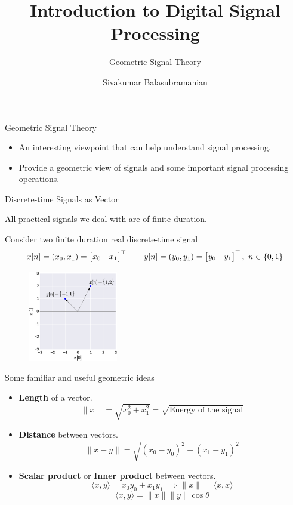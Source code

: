 \documentclass[aspectratio=169]{beamer}
\title{Introduction to Digital Signal Processing}
\subtitle{Geometric Signal Theory}
\author{Sivakumar Balasubramanian}
\institute[Christian Medical College] %
{
  \inst{}%
  Department of Bioengineering\\
  Christian Medical College, Bagayam\\
  Vellore 632002
}
\date{}
\let\olditem\item
\renewcommand{\item}{\setlength{\itemsep}{\fill}\olditem}
\def\lp{\ensuremath\left(}
\def\rp{\ensuremath\right)}
\def\bmx{\ensuremath\begin{bmatrix*}[r]}
\def\emx{\ensuremath\end{bmatrix*}}
\begin{document}
\begin{frame}
  \titlepage
\end{frame}

\begin{frame}{Geometric Signal Theory}
\begin{itemize}
  \item An interesting viewpoint that can help understand signal processing.
  \item Provide a geometric view of signals and some important signal processing operations.
\end{itemize}
\end{frame}

\begin{frame}[t]{Discrete-time Signals as Vector}

All practical signals we deal with are of finite duration.

Consider two finite duration real discrete-time signal 
\[ x[n] = \lp x_0, x_1 \rp = \bmx x_0 & x_1\emx^\top  \quad \quad y[n] = \lp y_0, y_1 \rp = \bmx y_0 & y_1 \emx^\top, \,\, n \in \{0, 1\} \]

\begin{figure}
\includegraphics[width=0.35\textwidth]{img/2dvec.eps}
\end{figure}

\end{frame}

\begin{frame}[t]{Some familiar and useful geometric ideas}

\begin{itemize}
\item \textbf{Length} of a vector.
\[ \|x\| = \sqrt{x_0^2 + x_1^2} = \sqrt{\text{Energy of the signal}} \]
\item \textbf{Distance} between vectors.
\[ \|x - y\| = \sqrt{\left(x_0 - y_0\right)^2 + \left(x_1 - y_1\right)^2} \]
\item \textbf{Scalar product} or \textbf{Inner product} between vectors.
\[ \langle x, y \rangle = x_0y_0 + x_1y_1 \implies \|x\| = \langle x, x \rangle \]
\[ \langle x, y \rangle = \|x\| \|y\| \cos \theta \]
\end{itemize}
\end{frame}
\end{document}

